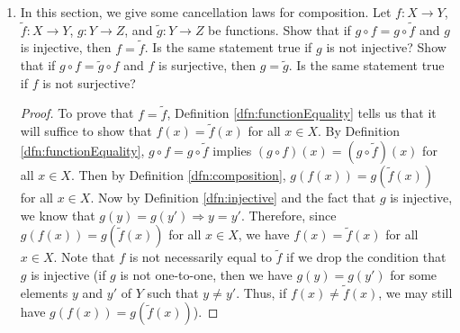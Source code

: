 \documentclass[../main.tex]{subfiles}
\begin{document}
\begin{enumerate}[ref={\thesection.\arabic*}]
    \begin{proof}
        The empty function is always injective: The statement "all distinct inputs map to distinct outputs" is vacuously true, since there exist no distinct inputs, or any inputs to speak of. The empty function is surjective iff its range is the empty set: In this case, the statement "for every $y\in\emptyset$, there exists $x\in\emptyset$ such that $f(x)=y$" is similarly vacuously true. Since a function is bijective iff it is both injective and surjective, we must take both take a sort of union of the two constraints above: We can conclude that the empty function is bijective iff "always and its range is the empty set" is true, i.e., iff its range is the empty set.
    \end{proof}
    \item \label{exr:3.3.4}In this section, we give some cancellation laws for composition. Let $f:X\to Y$, $\tilde{f}:X\to Y$, $g:Y\to Z$, and $\tilde{g}:Y\to Z$ be functions. Show that if $g\circ f=g\circ \tilde{f}$ and $g$ is injective, then $f=\tilde{f}$. Is the same statement true if $g$ is not injective? Show that if $g\circ f=\tilde{g}\circ f$ and $f$ is surjective, then $g=\tilde{g}$. Is the same statement true if $f$ is not surjective?
    \begin{proof}
        To prove that $f=\tilde{f}$, Definition \ref{dfn:functionEquality} tells us that it will suffice to show that $f(x)=\tilde{f}(x)$ for all $x\in X$. By Definition \ref{dfn:functionEquality}, $g\circ f=g\circ\tilde{f}$ implies $(g\circ f)(x)=(g\circ\tilde{f})(x)$ for all $x\in X$. Then by Definition \ref{dfn:composition}, $g(f(x))=g(\tilde{f}(x))$ for all $x\in X$. Now by Definition \ref{dfn:injective} and the fact that $g$ is injective, we know that $g(y)=g(y') \Longrightarrow y=y'$. Therefore, since $g(f(x))=g(\tilde{f}(x))$ for all $x\in X$, we have $f(x)=\tilde{f}(x)$ for all $x\in X$. Note that $f$ is not necessarily equal to $\tilde{f}$ if we drop the condition that $g$ is injective (if $g$ is not one-to-one, then we have $g(y)=g(y')$ for some elements $y$ and $y'$ of $Y$ such that $y\neq y'$. Thus, if $f(x)\neq\tilde{f}(x)$, we may still have $g(f(x))=g(\tilde{f}(x))$).\par

\end{proof}
\end{enumerate}
\end{document}

